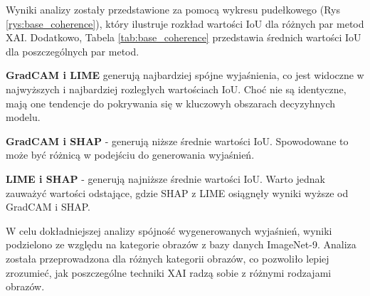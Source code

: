 Wyniki analizy zostały przedstawione za pomocą wykresu pudełkowego (Rys \ref{rys:base_coherence}), który ilustruje rozkład wartości IoU dla różnych par metod XAI.
Dodatkowo, Tabela \ref{tab:base_coherence} przedstawia średnich wartości IoU dla poszczególnych par metod.

\textbf{GradCAM i LIME} generują najbardziej spójne wyjaśnienia, co jest widoczne w najwyższych i najbardziej rozległych wartościach IoU.
Choć nie są identyczne, mają one tendencje do pokrywania się w kluczowyh obszarach decyzyhnych modelu.

\textbf{GradCAM i SHAP} - generują niższe średnie wartości IoU.
Spowodowane to może być różnicą w podejściu do generowania wyjaśnień.

\textbf{LIME i SHAP} - generują najniższe średnie wartości IoU.
Warto jednak zauważyć wartości odstające, gdzie SHAP z LIME osiągnęły wyniki wyższe od GradCAM i SHAP.

\vspace{1cm}

W celu dokładniejszej analizy spójność wygenerowanych wyjaśnień, wyniki podzielono ze względu na kategorie obrazów z bazy danych ImageNet-9.
Analiza została przeprowadzona dla różnych kategorii obrazów, co pozwoliło lepiej zrozumieć, jak poszczególne techniki XAI radzą sobie z różnymi rodzajami obrazów.

